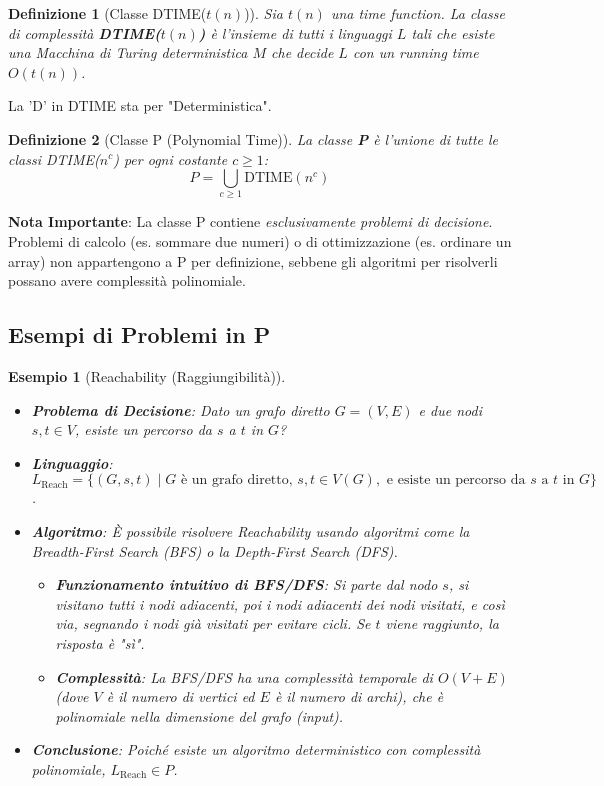 \documentclass[a4paper]{article}
\newtheorem{definition}{Definizione}[section]
\newtheorem{example}{Esempio}[section]
\begin{document}
\begin{definition}[Classe DTIME($t(n)$)]
Sia $t(n)$ una time function. La classe di complessità \textbf{DTIME($t(n)$)} è l'insieme di tutti i linguaggi $L$ tali che esiste una Macchina di Turing \emph{deterministica} $M$ che decide $L$ con un running time $O(t(n))$.
\end{definition}
La 'D' in DTIME sta per "Deterministica".

\begin{definition}[Classe P (Polynomial Time)]
La classe \textbf{P} è l'unione di tutte le classi DTIME($n^c$) per ogni costante $c \ge 1$:
\[ P = \bigcup_{c \ge 1} \text{DTIME}(n^c) \]
\end{definition}
\textbf{Nota Importante}: La classe P contiene \emph{esclusivamente problemi di decisione}. Problemi di calcolo (es. sommare due numeri) o di ottimizzazione (es. ordinare un array) non appartengono a P per definizione, sebbene gli algoritmi per risolverli possano avere complessità polinomiale.

\subsection{Esempi di Problemi in P}

\begin{example}[Reachability (Raggiungibilità)]
\begin{itemize}
    \item \textbf{Problema di Decisione}: Dato un grafo diretto $G=(V, E)$ e due nodi $s, t \in V$, esiste un percorso da $s$ a $t$ in $G$?
    \item \textbf{Linguaggio}: $L_{\text{Reach}} = \{ (G, s, t) \mid G \text{ è un grafo diretto, } s, t \in V(G), \text{ e esiste un percorso da } s \text{ a } t \text{ in } G \}$.
    \item \textbf{Algoritmo}: È possibile risolvere Reachability usando algoritmi come la Breadth-First Search (BFS) o la Depth-First Search (DFS).
        \begin{itemize}
            \item \textbf{Funzionamento intuitivo di BFS/DFS}: Si parte dal nodo $s$, si visitano tutti i nodi adiacenti, poi i nodi adiacenti dei nodi visitati, e così via, segnando i nodi già visitati per evitare cicli. Se $t$ viene raggiunto, la risposta è "sì".
            \item \textbf{Complessità}: La BFS/DFS ha una complessità temporale di $O(V+E)$ (dove $V$ è il numero di vertici ed $E$ è il numero di archi), che è polinomiale nella dimensione del grafo (input).
        \end{itemize}
    \item \textbf{Conclusione}: Poiché esiste un algoritmo deterministico con complessità polinomiale, $L_{\text{Reach}} \in P$.
\end{itemize}
\end{example}
\end{document}
